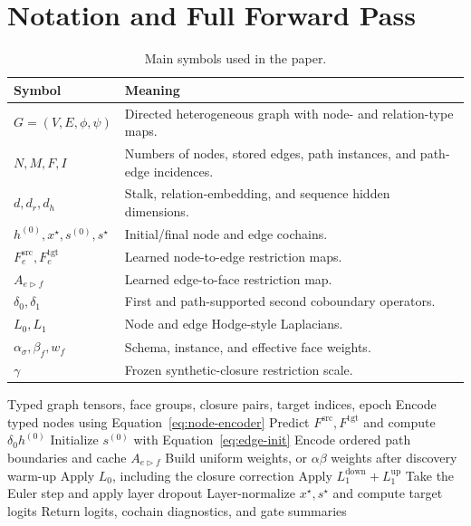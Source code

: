 


\appendix

\section{Notation and Full Forward Pass}
\label{app:notation}

\begin{table}[t]
  \centering
  \caption{Main symbols used in the paper.}
  \small
  \begin{tabular}{p{}p{}}
    \toprule
    \textbf{Symbol} & \textbf{Meaning} \\
    \midrule
    $G=(V,E,\phi,\psi)$ & Directed heterogeneous graph with node- and relation-type maps. \\
    $N,M,F,I$ & Numbers of nodes, stored edges, path instances, and path-edge incidences. \\
    $d,d_r,d_h$ & Stalk, relation-embedding, and sequence hidden dimensions. \\
    $h^{(0)},x^\star,s^{(0)},s^\star$ & Initial/final node and edge cochains. \\
    $F_e^{\mathrm{src}},F_e^{\mathrm{tgt}}$ & Learned node-to-edge restriction maps. \\
    $A_{e\triangleright f}$ & Learned edge-to-face restriction map. \\
    $\delta_0,\delta_1$ & First and path-supported second coboundary operators. \\
    $L_0,L_1$ & Node and edge Hodge-style Laplacians. \\
    $\alpha_\sigma,\beta_f,w_f$ & Schema, instance, and effective face weights. \\
    $\gamma$ & Frozen synthetic-closure restriction scale. \\
    \bottomrule
  \end{tabular}
\end{table}

\begin{algorithm}[h]
  \caption{\method{} forward pass for node classification}
  \begin{algorithmic}[1]
    \REQUIRE Typed graph tensors, face groups, closure pairs, target indices, epoch
    \STATE Encode typed nodes using Equation~\ref{eq:node-encoder}
    \STATE Predict $F^{\mathrm{src}},F^{\mathrm{tgt}}$ and compute $\delta_0h^{(0)}$
    \STATE Initialize $s^{(0)}$ with Equation~\ref{eq:edge-init}
    \STATE Encode ordered path boundaries and cache $A_{e\triangleright f}$
    \STATE Build uniform weights, or $\alpha\beta$ weights after discovery warm-up
      \STATE Apply $L_0$, including the closure correction
      \STATE Apply $L_1^{\mathrm{down}}+L_1^{\mathrm{up}}$
      \STATE Take the Euler step and apply layer dropout
    \ENDFOR
    \STATE Layer-normalize $x^\star,s^\star$ and compute target logits
    \STATE Return logits, cochain diagnostics, and gate summaries
  \end{algorithmic}
\end{algorithm}

